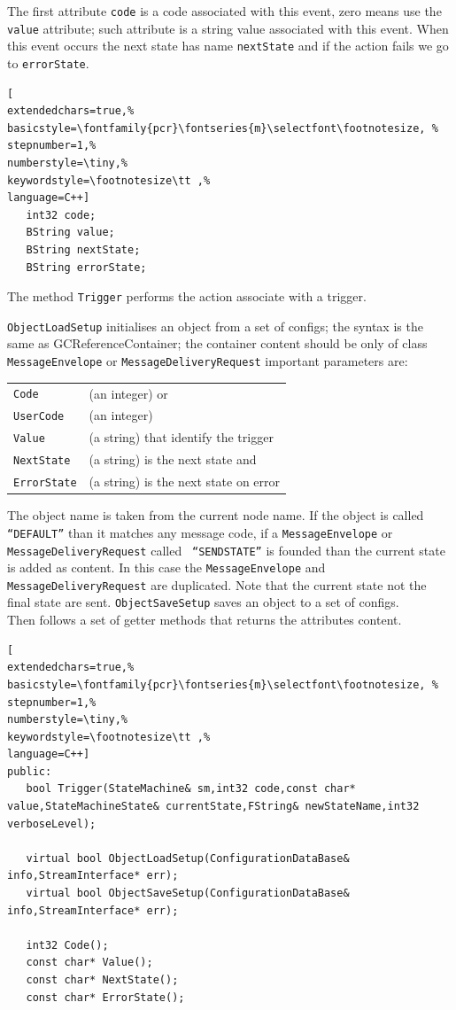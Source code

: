 The first attribute \texttt{code} is a code associated with this event, zero means use the \texttt{value} attribute; such attribute is a string value associated with this event. When this event occurs the next state has name \texttt{nextState} and if the action fails we go to \texttt{errorState}.
\begin{lstlisting}[
extendedchars=true,%
basicstyle=\fontfamily{pcr}\fontseries{m}\selectfont\footnotesize, %
stepnumber=1,%
numberstyle=\tiny,%
keywordstyle=\footnotesize\tt ,%
language=C++]
   int32 code;
   BString value;
   BString nextState;
   BString errorState;
\end{lstlisting}

The method \texttt{Trigger} performs the action associate with a trigger.

\texttt{ObjectLoadSetup} initialises an object from a set of configs; the syntax is the same as GCReferenceContainer; the container content should be only of class \texttt{MessageEnvelope} or \texttt{MessageDeliveryRequest} important parameters are:

\begin{table}[!h]
  \begin{tabular}{ll}
\texttt{Code} & (an integer) or \\
\texttt{UserCode} &(an integer) \\
\texttt{Value} & (a string) that identify the trigger \\
\texttt{NextState} & (a string) is the next state and \\
\texttt{ErrorState} & (a string) is the next state on error \\
  \end{tabular}
\end{table}

The object name is taken from the current node name. If the object is called \texttt{``DEFAULT''} than it matches any message code, if a \texttt{MessageEnvelope} or \texttt{MessageDeliveryRequest} called \texttt{
``SENDSTATE''} is founded than the current state is added as content. In this case the \texttt{MessageEnvelope} and \texttt{MessageDeliveryRequest} are duplicated. Note that the current state not the final state are sent. \texttt{ObjectSaveSetup} saves an object to a set of configs.\\


Then follows a set of getter methods that returns the attributes content.
\begin{lstlisting}[
extendedchars=true,%
basicstyle=\fontfamily{pcr}\fontseries{m}\selectfont\footnotesize, %
stepnumber=1,%
numberstyle=\tiny,%
keywordstyle=\footnotesize\tt ,%
language=C++]
public:
   bool Trigger(StateMachine& sm,int32 code,const char* value,StateMachineState& currentState,FString& newStateName,int32 verboseLevel);

   virtual bool ObjectLoadSetup(ConfigurationDataBase& info,StreamInterface* err);
   virtual bool ObjectSaveSetup(ConfigurationDataBase& info,StreamInterface* err);

   int32 Code();
   const char* Value();
   const char* NextState();
   const char* ErrorState();
\end{lstlisting}



